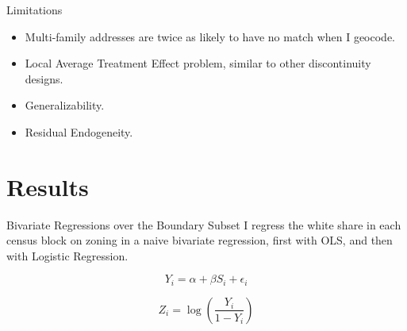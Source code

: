 \documentclass{beamer}
\begin{document}
\begin{frame}{Limitations}
    \begin{itemize}
        \item Multi-family addresses are twice as likely to have no match when I geocode.
        \item Local Average Treatment Effect problem, similar to other discontinuity designs.
        \item Generalizability.
        \item Residual Endogeneity.
    \end{itemize}
\end{frame}

\section{Results}

\begin{frame}{Bivariate Regressions over the Boundary Subset}
    I regress the white share in each census block on zoning in a naive bivariate regression, first with OLS, and then with Logistic Regression.
    
    \begin{equation} \label{biv_regression}
        Y_i=\alpha+\beta S_i+\epsilon_i
    \end{equation}
    
    \begin{equation}
        Z_i=\log\left(\frac{Y_i}{1-Y_i}\right)
    \end{equation}
\end{frame}
\end{document}
